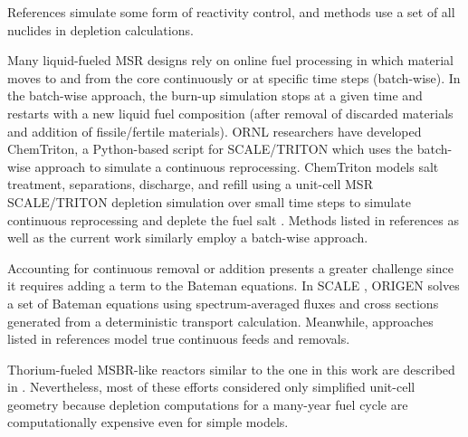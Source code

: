 References 
\cite{doligez_coupled_2014,heuer_towards_2014,sheu_depletion_2013,aufiero_extended_2013} 
simulate some form of reactivity control, and methods 
\cite{doligez_coupled_2014,heuer_towards_2014,aufiero_extended_2013,ahmad_neutronics_2015, 
park_whole_2015, 
jeong_equilibrium_2016,rykhlevskii_online_2017,nuttin_potential_2005} use a set 
of all nuclides in depletion calculations. 

Many liquid-fueled \gls{MSR} designs rely on online fuel processing in which  
material moves to and from the core continuously or at specific time steps 
(batch-wise). In the batch-wise approach, the burn-up simulation stops at a given 
time and restarts with a new liquid fuel composition (after removal of discarded 
materials and addition of fissile/fertile materials). \gls{ORNL} researchers 
have developed ChemTriton, a Python-based script for SCALE/TRITON which uses the 
batch-wise approach to simulate a continuous reprocessing. ChemTriton models salt 
treatment, separations, discharge, and refill using a unit-cell \gls{MSR} 
SCALE/TRITON depletion simulation over small time steps to simulate continuous 
reprocessing and deplete the fuel salt \cite{powers_new_2013}. Methods listed in 
references \cite{fiorina_investigation_2013,sheu_depletion_2013,park_whole_2015, 
jeong_equilibrium_2016,powers_inventory_2014,betzler_molten_2017,rykhlevskii_online_2017} 
as well as the current work similarly employ a batch-wise approach.

Accounting for continuous removal or addition presents a greater challenge since it 
requires adding a term to the Bateman equations. In SCALE 
\cite{bowman_scale_2011}, ORIGEN \cite{gauld_isotopic_2011} solves a set of 
Bateman equations using spectrum-averaged fluxes and cross sections generated 
from a deterministic transport calculation. Meanwhile, approaches listed in references 
\cite{doligez_coupled_2014,heuer_towards_2014,aufiero_extended_2013,nuttin_potential_2005} 
model true continuous feeds and removals. 

Thorium-fueled \gls{MSBR}-like reactors similar to the one in this work are 
described in \cite{park_whole_2015, 
jeong_equilibrium_2016,powers_new_2013,powers_inventory_2014, 
betzler_molten_2017,rykhlevskii_online_2017,nuttin_potential_2005}. 
Nevertheless, most of these efforts considered only simplified unit-cell 
geometry because depletion computations for a many-year fuel cycle are 
computationally expensive even for simple models. 

